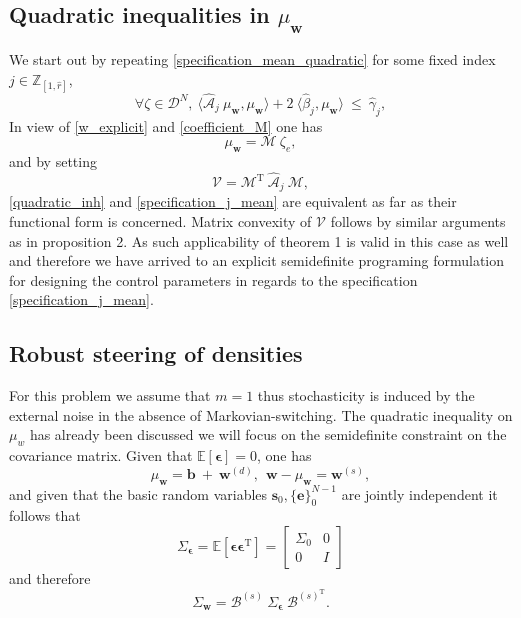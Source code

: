 \documentclass[letterpaper,11pt]{article}
\newcommand{\AR}[2]{\left[\begin{array}{#1}#2\end{array}\right]}
\newcommand{\T}{\mathrm{T}}
\begin{document}
\subsection{Quadratic inequalities in  $\mu_{\mathbf{w}}$ }

We start out by repeating \eqref{specification_mean_quadratic}  for some fixed index $j \in \mathbb{Z}_{[1,\hat{r}]}$,
\begin{equation}
\label{specification_j_mean}
\forall   \zeta \in \mathscr{D}^N, ~ \langle \hat{\mathcal{A}}_j ~  \mu_\mathbf{w},   \mu_\mathbf{w} \rangle + 2 ~ \langle \hat{\beta}_j ,  \mu_\mathbf{w} \rangle  ~ \leq~ \hat{\gamma}_j, 
\end{equation}
In view of \eqref{w_explicit} and \eqref{coefficient_M} one has  
$$
\mu_\mathbf{w} = \mathcal{M} ~ \zeta_e,
$$
and by setting 
$$
\mathcal{V} = \mathcal{M}^{\T} ~ \hat{\mathcal{A}}_j ~ \mathcal{M},
$$
\eqref{quadratic_inh} and \eqref{specification_j_mean} are equivalent as far as their functional form is concerned. 
Matrix convexity of $\mathcal{V}$ follows by similar arguments as in proposition 2. As such applicability of theorem 1 is valid in this case as well  
and therefore we have arrived to an explicit semidefinite programing formulation for designing the control parameters in regards to the specification
\eqref{specification_j_mean}.

\subsection{Robust steering of densities }

For this problem we assume that $m=1$ thus stochasticity is induced by the external noise in the absence of Markovian-switching.
The quadratic inequality on $\mu_w$ has already been discussed we will focus on the semidefinite constraint on the covariance matrix. 
Given that $ \mathbb{E}[\bm{\epsilon}] = 0$, one has
\begin{equation}
\label{mean_formula}
\mu_{\mathbf{w}} = \bm{b}
~ + ~ \mathbf{w}^{(d)},~~ \mathbf{w} - \mu_{\mathbf{w}} = 
\mathbf{w}^{(s)},
\end{equation}
and given that the basic random variables $ \mathbf{s}_0, 
\{ \mathbf{e} \}_0^{N-1}
$
are jointly independent it follows that  
$$
\Sigma_{\bm{\epsilon}} = \mathbb{E}[ \bm{\epsilon} \bm{\epsilon}^{\T}] = \AR{cc}{\Sigma_0 & 0 \\  0 & I}
$$
and therefore 
\begin{equation}
\label{covariance_formula}
\Sigma_{\mathbf{w}} =  \bm{\mathcal{B}}^{(s)} ~ 
\Sigma_{\bm{\epsilon}}~ \bm{\mathcal{B}}^{{(s)}^{\T}}.
\end{equation}
\end{document}
